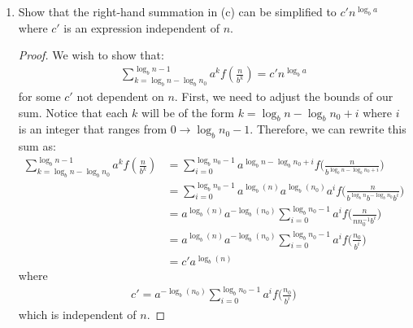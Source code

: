 \documentclass[11pt]{article}
\begin{document}
\begin{enumerate}
\begin{enumerate}
\noindent
for some constant $y$ independent of $n$.  What is this $y$?\\ \\
$y=\log_b(n_0)$.
\begin{proof}
This is evident from our use of logarithm rules.  $\log_b(\frac{n}{n_0}) = \log_b(n) - \log_b(n_0)$, therefore we can rewrite the summation in \textbf{(a)} to be:
\begin{align*}
\sum_{k=0}^{\log_b(\frac{n}{n_0})-1} a^k f\bigl( \frac{n}{b^k} \bigr) = \sum_{k = 0}^{\log_b n - 1} a^k f(n/b^k) - 
  \sum_{k = \log_b n - \log_b n_0}^{\log_b n - 1} a^k f(n/b^k) 
\end{align*}
This is also evident, because we wish to remove all the terms between levels $\log_b(\frac{n}{n_0})$ and $\log_b(n)$.  That is, for all levels smaller than the base case $n_0$.
\end{proof}
\item Show that the right-hand summation in (c) can be simplified to $c'
n^{\log_b a}$ where $c'$ is an expression independent of $n$.  
\begin{proof} We wish to show that:
\begin{align*}
\sum_{k = \log_b n - \log_b n_0 }^{\log_b n - 1} a^k f(\frac{n}{b^k}) = c'n^{\log_b a}
\end{align*}
for some $c'$ not dependent on $n$.  First, we need to adjust the bounds of our sum.  Notice that each $k$ will be of the form $k = \log_b n - \log_b n_0 +i$ where $i$ is an integer that ranges from $0 \to \log_b n_0-1$.  Therefore, we can rewrite this sum as: 
\begin{align*}
\sum_{k = \log_b n - \log_b n_0 }^{\log_b n - 1} a^k f(\frac{n}{b^k}) &= 
\sum_{i=0}^{\log_b n_0 -1} a^{\log_b n - \log_b n_0 +i }f\bigl(\frac{n}{b^{\log_b n -\log_b n_0 +i}}\bigr)\\
&= \sum_{i=0}^{\log_b n_0 -1}a^{\log_b(n)}a^{\log_b(n_0)}a^i f\bigl(\frac{n}{b^{\log_b n}b^{-\log_b n_0} b^i}\bigr) \\
&= a^{\log_b(n)}a^{-\log_b(n_0)} \sum_{i=0}^{\log_b n_0 -1}a^i f \bigl(\frac{n}{n n_0^{-1} b^i}\bigr) \\
&= a^{\log_b(n)}a^{-\log_b(n_0)} \sum_{i=0}^{\log_b n_0 -1}a^i f \bigl(\frac{n_0}{b^i}\bigr) \\
&= c'a^{\log_b(n)}
\end{align*}
where
\begin{align*}
c'= a^{-\log_b(n_0)} \sum_{i=0}^{\log_b n_0 -1}a^i f \bigl(\frac{n_0}{b^i}\bigr)
\end{align*}
which is independent of $n$.
\end{proof}
\end{enumerate}
\end{enumerate}
\end{document}

